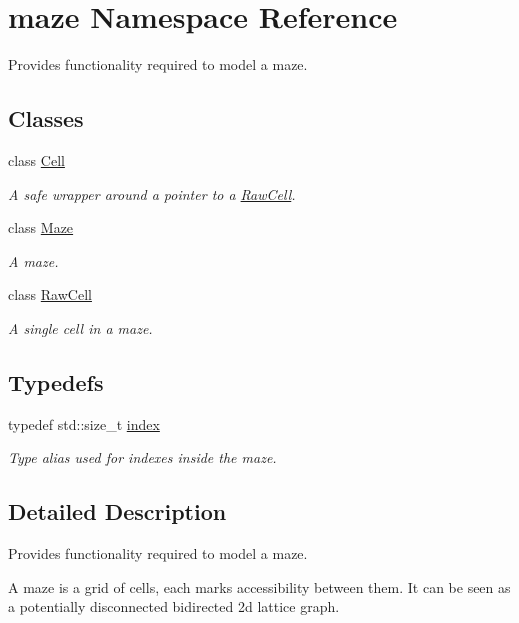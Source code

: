 \hypertarget{namespacemaze}{}\section{maze Namespace Reference}
\label{namespacemaze}


Provides functionality required to model a maze.  


\subsection*{Classes}
\begin{DoxyCompactItemize}
\item 
class \hyperlink{classmaze_1_1Cell}{Cell}
\begin{DoxyCompactList}\small\item\em A safe wrapper around a pointer to a \hyperlink{classmaze_1_1RawCell}{Raw\+Cell}. \end{DoxyCompactList}\item 
class \hyperlink{classmaze_1_1Maze}{Maze}
\begin{DoxyCompactList}\small\item\em A maze. \end{DoxyCompactList}\item 
class \hyperlink{classmaze_1_1RawCell}{Raw\+Cell}
\begin{DoxyCompactList}\small\item\em A single cell in a maze. \end{DoxyCompactList}\end{DoxyCompactItemize}
\subsection*{Typedefs}
\begin{DoxyCompactItemize}
\item 
\mbox{\label{namespacemaze_ae8120a098fabafbbfa264a3c619640b3}} 
typedef std\+::size\+\_\+t \hyperlink{namespacemaze_ae8120a098fabafbbfa264a3c619640b3}{index}
\begin{DoxyCompactList}\small\item\em Type alias used for indexes inside the maze. \end{DoxyCompactList}\end{DoxyCompactItemize}


\subsection{Detailed Description}
Provides functionality required to model a maze. 

A maze is a grid of cells, each marks accessibility between them. It can be seen as a potentially disconnected bidirected 2d lattice graph. 